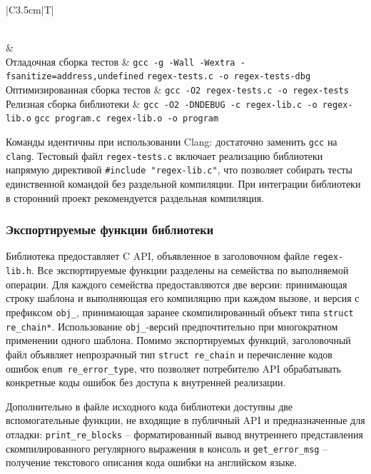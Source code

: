 \begin{xltabular}{\textwidth}{|C{3.5cm}|T|}
	\caption{Команды сборки библиотеки}
	\label{tab:build_commands} \\
	\hline
	 &  \\
	\hline
	\finishhead
	Отладочная сборка тестов & \verb`gcc -g -Wall -Wextra -fsanitize=address,undefined`
	\verb`regex-tests.c -o regex-tests-dbg` \\
	\hline
	Оптимизированная сборка тестов & \verb`gcc -O2 regex-tests.c -o regex-tests` \\
	\hline
	Релизная сборка библиотеки & \verb`gcc -O2 -DNDEBUG -c regex-lib.c -o regex-lib.o` \verb`gcc program.c regex-lib.o -o program` \\
\end{xltabular}

Команды идентичны при использовании Clang: достаточно заменить
\verb`gcc` на \verb`clang`. Тестовый файл \verb`regex-tests.c` включает
реализацию библиотеки напрямую директивой \verb`#include "regex-lib.c"`,
что позволяет собирать тесты единственной командой без раздельной
компиляции. При интеграции библиотеки в сторонний проект рекомендуется
раздельная компиляция.



\subsubsection{Экспортируемые функции библиотеки}

Библиотека предоставляет C API, объявленное в заголовочном файле \verb`regex-lib.h`. Все экспортируемые функции разделены на семейства по выполняемой операции. Для каждого семейства предоставляются две версии: принимающая строку шаблона и выполняющая его компиляцию при каждом вызове, и версия с префиксом \verb`obj_`, принимающая заранее скомпилированный объект типа \verb`struct re_chain*`. Использование \verb`obj_`-версий предпочтительно при многократном применении одного шаблона. 
Помимо экспортируемых функций, заголовочный файл объявляет непрозрачный тип \verb`struct re_chain` и перечисление кодов ошибок \verb`enum re_error_type`, что позволяет потребителю API обрабатывать конкретные коды ошибок без доступа к внутренней реализации.

Дополнительно в файле исходного кода библиотеки доступны две вспомогательные функции, не входящие в публичный API и предназначенные для отладки:
\verb`print_re_blocks` -- форматированный вывод внутреннего представления скомпилированного регулярного выражения в консоль и
\verb`get_error_msg` -- получение текстового описания кода ошибки на английском языке.
\\

